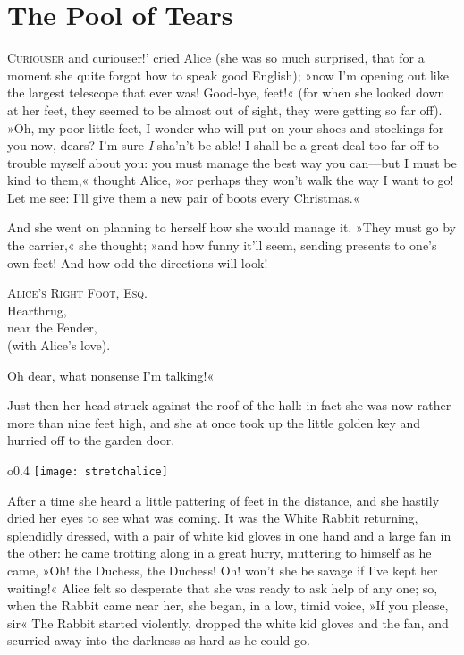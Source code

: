 \chapter{The Pool of Tears}
\lettrine[lines=4,ante=`,findent=2pt]{C}{uriouser} and curiouser!' cried Alice (she was so much surprised, that for a moment she quite forgot how to speak good English); »now I'm opening out like the largest telescope that ever was! Good-bye, feet!« (for when she looked down at her feet, they seemed to be almost out of sight, they were getting so far off). »Oh, my poor little feet, I wonder who will put on your shoes and stockings for you now, dears? I'm sure \textit{I} sha'n't be able! I shall be a great deal too far off to trouble myself about you: you must manage the best way you can—but I must be kind to them,« thought Alice, »or perhaps they won't walk the way I want to go! Let me see: I'll give them a new pair of boots every Christmas.«

And she went on planning to herself how she would manage it. »They must go by the carrier,« she thought; »and how funny it'll seem, sending presents to one's own feet! And how odd the directions will look!

\begin{center}
\textsc{Alice's Right Foot, Esq.}\\
Hearthrug,\\
near the Fender,\\
(with Alice's love).
\end{center}

Oh dear, what nonsense I'm talking!«

Just then her head struck against the roof of the hall: in fact she was now rather more than nine feet high, and she at once took up the little golden key and hurried off to the garden door.

\begin{wrapfigure}{o}{0.4\textwidth}
\centering
\texttt{[image: stretchalice]}
\end{wrapfigure}

After a time she heard a little pattering of feet in the distance, and she hastily dried her eyes to see what was coming. It was the White Rabbit returning, splendidly dressed, with a pair of white kid gloves in one hand and a large fan in the other: he came trotting along in a great hurry, muttering to himself as he came, »Oh! the Duchess, the Duchess! Oh! won't she be savage if I've kept her waiting!« Alice felt so desperate that she was ready to ask help of any one; so, when the Rabbit came near her, she began, in a low, timid voice, »If you please, sir\longdash« The Rabbit started violently, dropped the white kid gloves and the fan, and scurried away into the darkness as hard as he could go.



